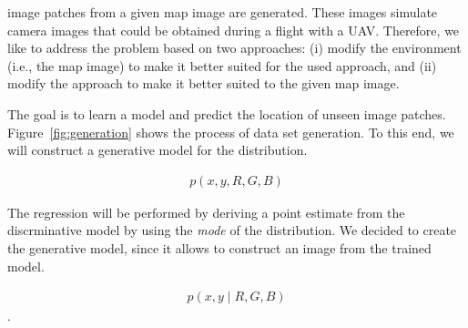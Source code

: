 \documentclass{article}
\begin{document}
image patches from a given map image are generated. These images
simulate camera images that could be obtained during a flight with a
UAV. Therefore, we like to address the problem based on two
approaches: (i) modify the environment (i.e., the map image) to make it
better suited for the used approach, and (ii) modify the approach to
make it better suited to the given map image. 

The goal is to learn a model and predict the location of unseen image
patches. Figure~\ref{fig:generation} shows the process of data set
generation. To this end, we will construct a generative model for the
distribution.

\begin{align}
p(x,y,R,G,B)  
\end{align}

The regression will be performed by deriving a point estimate from the
discrminative model by using the \emph{mode} of the distribution. We
decided to create the generative model, since it allows to construct
an image from the trained model.

\begin{align}
p(x,y \mid R,G,B)  
\end{align}
. 
\end{document}
